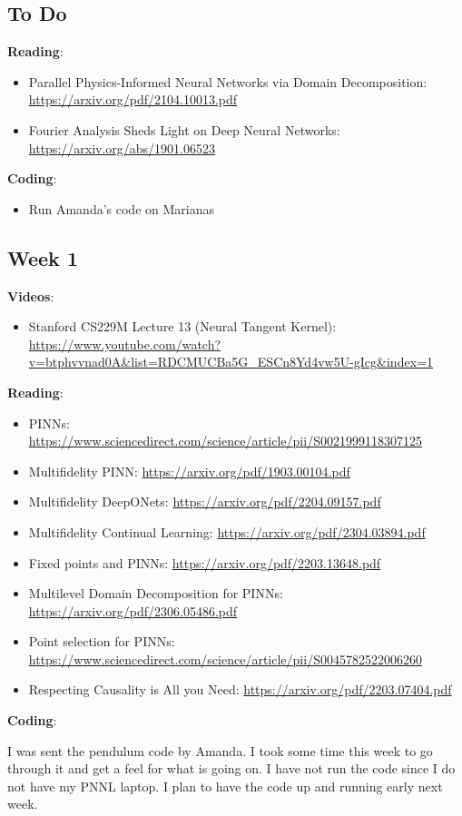 \documentclass{article}
\def\bf{\textbf}
\begin{document}
\subsection*{To Do}
\bf{Reading}:
\begin{itemize}
	\item Parallel Physics-Informed Neural Networks via Domain Decomposition: \url{https://arxiv.org/pdf/2104.10013.pdf}
	\item Fourier Analysis Sheds Light on Deep Neural Networks: \url{https://arxiv.org/abs/1901.06523}
\end{itemize}
\bf{Coding}:
\begin{itemize}
\item Run Amanda's code on Marianas
\end{itemize}

\newpage
\subsection*{Week 1}
\bf{Videos}:
\begin{itemize}
	\item Stanford CS229M Lecture 13 (Neural Tangent Kernel): \url{https://www.youtube.com/watch?v=btphvvnad0A&list=RDCMUCBa5G_ESCn8Yd4vw5U-gIcg&index=1}
\end{itemize}
\bf{Reading}:
\begin{itemize}
	\item PINNs: \url{https://www.sciencedirect.com/science/article/pii/S0021999118307125}
	\item Multifidelity PINN: \url{https://arxiv.org/pdf/1903.00104.pdf}
	\item Multifidelity DeepONets: \url{https://arxiv.org/pdf/2204.09157.pdf}
	\item Multifidelity Continual Learning: \url{https://arxiv.org/pdf/2304.03894.pdf}
	\item Fixed points and PINNs: \url{https://arxiv.org/pdf/2203.13648.pdf}
	\item Multilevel Domain Decomposition for PINNs: \url{https://arxiv.org/pdf/2306.05486.pdf}
	\item Point selection for PINNs: \url{https://www.sciencedirect.com/science/article/pii/S0045782522006260}
	\item Respecting Causality is All you Need: \url{https://arxiv.org/pdf/2203.07404.pdf}
\end{itemize}
\bf{Coding}:\\
\par I was sent the pendulum code by Amanda. I took some time this week to go through it and get a feel for what is going on. I have not run the code since I do not have my PNNL laptop. I plan to have the code up and running early next week.
\newpage
\end{document}

